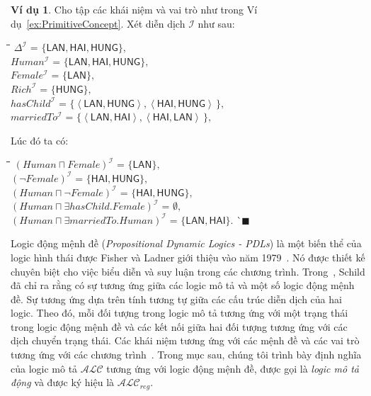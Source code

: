 \documentclass[12pt,a4paper,twoside]{report}
\newcommand{\mI}		{\mathcal{I}}
\newcommand{\ALC}		{$\mathcal{ALC}$\xspace}
\newcommand{\ALCreg}	{$\mathcal{ALC}_{reg}$\xspace}
\newcommand{\myend}		{\mbox{}\hfill\mbox{{\scriptsize$\!\blacksquare$}}}
\newcommand{\tuple}[1]	{\left\langle#1\right\rangle\!}
\newcommand{\mand}		{\sqcap}
\newcommand{\E}			{\exists}
\newcommand{\Human}			{Human}
\newcommand{\Female}		{Female}
\newcommand{\Rich}			{Rich}
\newcommand{\hasChild}		{hasChild}
\newcommand{\marriedTo}		{marriedTo}
\newcommand{\iLAN}		{\mathsf{LAN}}
\newcommand{\iHUNG}		{\mathsf{HUNG}}
\newcommand{\iHAI}		{\mathsf{HAI}}
\theoremstyle{definition}
\newtheorem{Example}{Ví dụ}[chapter]
\begin{document}
\begin{Example}
Cho tập các khái niệm và vai trò như trong Ví dụ~\ref{ex:PrimitiveConcept}. Xét diễn dịch $\mI$ như sau:
\begin{tabbing}
  \hspace*{0.85cm}\=\hspace*{2.4cm}\=\hspace*{\textwidth}\=\kill
  \> $\Delta^\mI$ \> = $\{\iLAN, \iHAI, \iHUNG\},$\\[0.5ex]
  \> $\Human^\mI$ \> = $\{\iLAN, \iHAI, \iHUNG\},$\\[0.5ex]
  \> $\Female^\mI$ \> = $\{\iLAN\},$ \\[0.5ex]
  \> $\Rich^\mI$ \>= $\{\iHUNG\},$\\
  \> $\hasChild^\mI$ \> = $\{\tuple{\iLAN, \iHUNG}, \tuple{\iHAI, \iHUNG}\,\},$ \\[0.5ex]
  \> $\marriedTo^\mI$ \> = $\{\tuple{\iLAN, \iHAI},\tuple{\iHAI, \iLAN}\,\},$
\end{tabbing}
Lúc đó ta có:
\begin{tabbing}
  \hspace*{0.85cm}\=\hspace*{6.4cm}\=\hspace*{0.5cm}\=\hspace*{\textwidth}\=\kill
  \> $(\Human \mand \Female)^\mI$ \> = \> $\{\iLAN\},$\\[0.5ex]
  \> $(\neg \Female)^\mI$ \> = $\{\iHAI, \iHUNG\},$\\[0.5ex]
  \> $(\Human \mand \neg \Female)^\mI$ \> = $\{\iHAI, \iHUNG\},$\\[0.5ex]
  \> $(\Human \mand \E \hasChild.\Female)^\mI$ \> = $\emptyset,$\\[0.5ex]
  \> $(\Human \mand \E \marriedTo.\Human)^\mI$ \> = $\{\iLAN, \iHAI\}.$ \`\myend
\end{tabbing}\end{Example}

Logic động mệnh đề ({\em Propositional Dynamic Logics - PDLs}) là một biến thể của logic hình thái được Fisher và Ladner giới thiệu vào năm 1979~\cite{Fischer1979}. Nó được thiết kế chuyên biệt cho việc biểu diễn và suy luận trong các chương trình. Trong~\cite{Schild1991}, Schild đã chỉ ra rằng có sự tương ứng giữa các logic mô tả và một số logic động mệnh đề. 
Sự tương ứng dựa trên tính tương tự giữa các cấu trúc diễn dịch của hai logic. Theo đó, mỗi đối tượng trong logic mô tả tương ứng với một trạng thái trong logic động mệnh đề và các kết nối giữa hai đối tượng tương ứng với các dịch chuyển trạng thái. Các khái niệm tương ứng với các mệnh đề và các vai trò tương ứng với các chương trình~\cite{Giacomo1994,Chang2007}.
Trong mục sau, chúng tôi trình bày định nghĩa của logic mô tả \ALC tương ứng với logic động mệnh đề, được gọi là {\em logic mô tả động} và được ký hiệu là \ALCreg.
\end{document}
